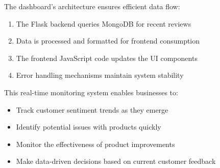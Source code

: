 \documentclass[11pt,a4paper,twocolumn]{article}
\begin{document}
The dashboard's architecture ensures efficient data flow:
\begin{enumerate}
    \item The Flask backend queries MongoDB for recent reviews
    \item Data is processed and formatted for frontend consumption
    \item The frontend JavaScript code updates the UI components
    \item Error handling mechanisms maintain system stability
\end{enumerate}

This real-time monitoring system enables businesses to:
\begin{itemize}
    \item Track customer sentiment trends as they emerge
    \item Identify potential issues with products quickly
    \item Monitor the effectiveness of product improvements
    \item Make data-driven decisions based on current customer feedback
\end{itemize}
\end{document}

